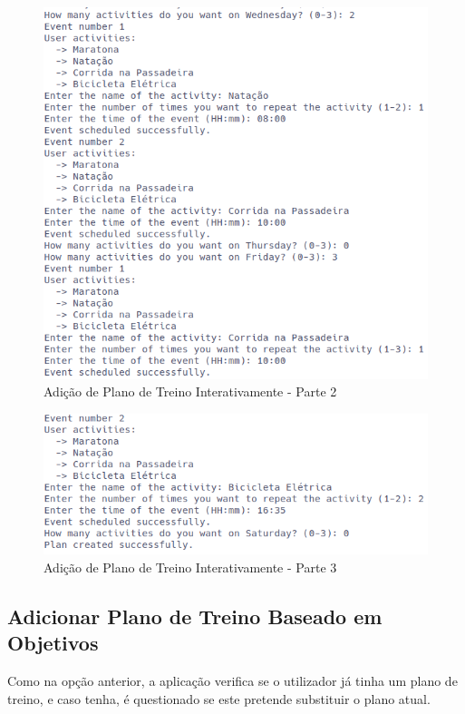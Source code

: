 \documentclass[a4paper,12pt]{scrreprt}
\begin{document}
    \begin{figure}[!ht]
        \centering
        \includegraphics[width=\textwidth]{images/createPlan2.png}
        \caption{Adição de Plano de Treino Interativamente - Parte 2}
        \label{fig:add-plan-2}
    \end{figure}

    \begin{figure}[!ht]
        \centering
        \includegraphics[width=\textwidth]{images/createPlan3.png}
        \caption{Adição de Plano de Treino Interativamente - Parte 3}
        \label{fig:add-plan-3}
    \end{figure}

    \clearpage
    \subsection{Adicionar Plano de Treino Baseado em Objetivos}
    Como na opção anterior, a aplicação verifica se o utilizador já tinha um plano de treino,
    e caso tenha, é questionado se este pretende substituir o plano atual.
\end{document}
